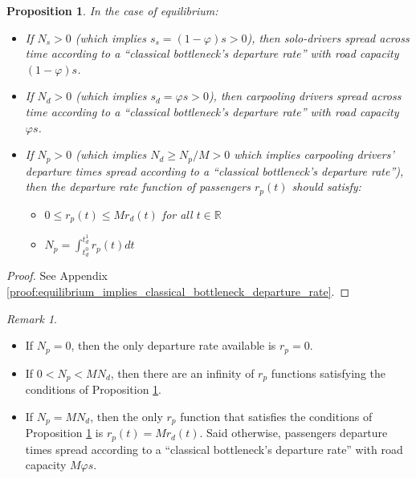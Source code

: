 \documentclass[english, a4paper]{article}
\theoremstyle{plain}
\newtheorem{proposition}{Proposition}
\theoremstyle{definition}
\theoremstyle{remark}
\newtheorem{remark}{Remark}
\begin{document}
\begin{proposition}
\label{proposition:equilibrium_implies_classical_bottleneck_departure_rate}
    In the case of equilibrium:
    \begin{itemize}
        \item If $N_s > 0$ (which implies $s_s = (1 - \varphi)s > 0$), then solo-drivers spread across time according to a ``classical bottleneck’s departure rate'' with road capacity $(1 - \varphi ) s$.
        \item If $N_d > 0$ (which implies $s_d = \varphi s > 0$), then carpooling drivers spread across time according to a ``classical bottleneck’s departure rate'' with road capacity $\varphi s$.
        \item If $N_p > 0$ (which implies $N_d \geq N_p / M > 0$ which implies carpooling drivers’ departure times spread according to a ``classical bottleneck’s departure rate''), then the departure rate function of passengers $r_p(t)$ should satisfy:\begin{itemize}
            \item $0 \leq r_p(t) \leq M r_d(t)$ for all $t\in \mathbb{R}$
            \item $N_p = \int_{t_d^0}^{t_d^1} r_p(t) dt$
        \end{itemize}
    \end{itemize}
\end{proposition}

\begin{proof}
    See Appendix \ref{proof:equilibrium_implies_classical_bottleneck_departure_rate}.
\end{proof}

\begin{remark} \begin{itemize}
    \item If $N_p = 0$, then the only departure rate available is $r_p = 0$.
    \item If $0 < N_p < MN_d$, then there are an infinity of $r_p$ functions satisfying the conditions of Proposition \ref{proposition:equilibrium_implies_classical_bottleneck_departure_rate}.
    \item If $N_p = MN_d$, then the only $r_p$ function that satisfies the conditions of Proposition \ref{proposition:equilibrium_implies_classical_bottleneck_departure_rate} is $r_p(t) = Mr_d(t)$. Said otherwise, passengers departure times spread according to a ``classical bottleneck’s departure rate'' with road capacity $M \varphi s$.

    \end{itemize}
\end{remark}
\end{document}
